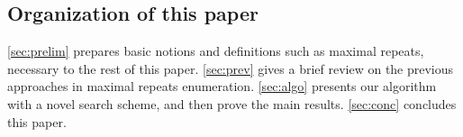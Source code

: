 
\subsection{Organization of this paper} 
\cref{sec:prelim} prepares basic notions and definitions such as maximal repeats, necessary to the rest of this paper. \cref{sec:prev} gives a brief review on the previous approaches in maximal repeats enumeration. \cref{sec:algo} presents our algorithm with a novel search scheme, and then prove the main results.
\cref{sec:conc} concludes this paper. 

